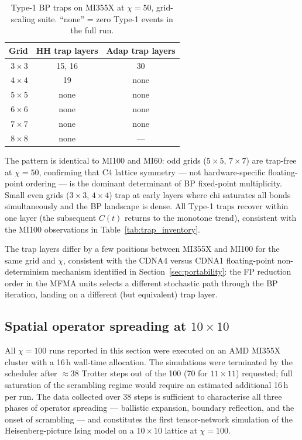 \begin{table}[ht]
\centering
\caption{Type-1 BP traps on MI355X at $\chi=50$, grid-scaling suite.
  ``none'' = zero Type-1 events in the full run.}
\label{tab:traps_mi355x}
\smallskip
\small
\begin{tabular}{r cc}
\toprule
Grid    & HH trap layers & Adap trap layers \\
\midrule
$3\times3$ & 15, 16         & 30               \\
$4\times4$ & 19             & none             \\
$5\times5$ & none           & none             \\
$6\times6$ & none           & none             \\
$7\times7$ & none           & none             \\
$8\times8$ & none           & ---              \\
\bottomrule
\end{tabular}
\end{table}

The pattern is identical to MI100 and MI60: odd grids ($5\times5$, $7\times7$)
are trap-free at $\chi=50$, confirming that C4 lattice symmetry --- not
hardware-specific floating-point ordering --- is the dominant determinant of BP
fixed-point multiplicity.
Small even grids ($3\times3$, $4\times4$) trap at early layers where chi
saturates all bonds simultaneously and the BP landscape is dense.
All Type-1 traps recover within one layer (the subsequent $C(t)$ returns to the
monotone trend), consistent with the MI100 observations in
Table~\ref{tab:trap_inventory}.

The trap layers differ by a few positions between MI355X and MI100 for the same
grid and $\chi$, consistent with the CDNA4 versus CDNA1 floating-point non-determinism
mechanism identified in Section~\ref{sec:portability}: the FP reduction order in
the MFMA units selects a different stochastic path through the BP iteration,
landing on a different (but equivalent) trap layer.

\subsection{Spatial operator spreading at $10\times10$}

All $\chi=100$ runs reported in this section were executed on an AMD MI355X
cluster with a 16\,h wall-time allocation.
The simulations were terminated by the scheduler after ${\approx}38$ Trotter
steps out of the 100 (70 for $11\times11$) requested; full saturation of the
scrambling regime would require an estimated additional 16\,h per run.
The data collected over 38 steps is sufficient to characterise all three
phases of operator spreading --- ballistic expansion, boundary reflection,
and the onset of scrambling --- and constitutes the first tensor-network
simulation of the Heisenberg-picture Ising model on a $10\times10$ lattice
at $\chi=100$.

